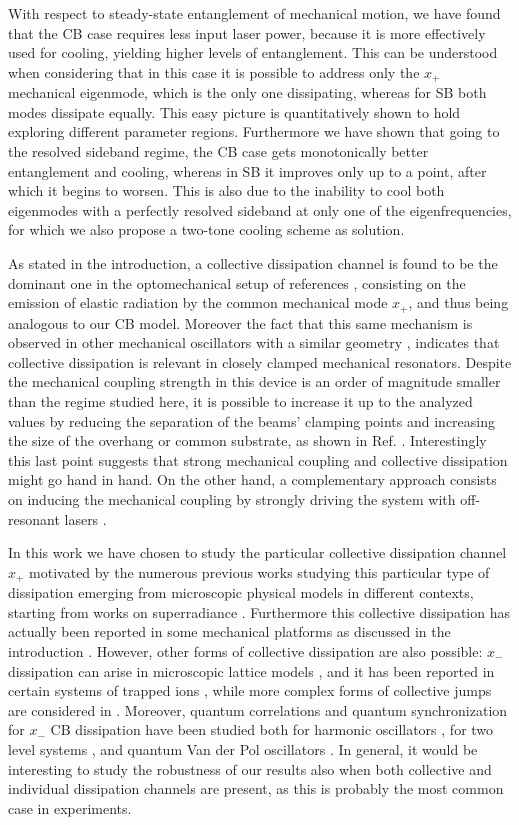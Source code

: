 \documentclass[a4paper]{jpconf}
\begin{document}
With respect to steady-state entanglement of
mechanical motion, we have found that the CB case requires less input laser power, because it
is more effectively used for cooling, yielding higher levels of entanglement. This can be understood
when considering that in this case it is possible to address only the $x_+$ mechanical eigenmode, which is the only one 
dissipating, whereas for SB both modes dissipate equally. This easy picture is quantitatively
shown to hold exploring different parameter regions. Furthermore we have shown that going to the resolved sideband regime, the CB case
gets monotonically better entanglement and cooling, whereas in SB it improves only up to a point, after
which it begins to worsen. This is also due to the inability to cool both eigenmodes with a perfectly
resolved sideband at only one of the eigenfrequencies, for which we also propose a two-tone cooling
scheme as solution.

As stated in the introduction, a collective dissipation channel is found to be the dominant one
in the optomechanical setup of references \cite{32,33}, consisting on the emission of elastic radiation by the common mechanical mode $x_+$, 
and thus being analogous to our CB model. Moreover the fact that this same mechanism is observed in other mechanical oscillators with a 
similar geometry \cite{36,37},
indicates that collective dissipation is relevant in closely clamped mechanical resonators. Despite the mechanical coupling strength
in this device \cite{32,33} is an order of magnitude smaller than the regime studied here, it is possible to
increase it up to the analyzed values by reducing the separation of the beams' clamping points and increasing the size of the overhang or common substrate, as shown in Ref. \cite{57}. 
Interestingly this last point suggests that strong mechanical coupling and collective dissipation might go hand in hand. On the other hand,
a complementary approach consists on inducing the mechanical coupling by strongly driving the system with off-resonant lasers \cite{38}. 

 In this work we have chosen to study the particular collective dissipation channel $x_+$ motivated by the numerous previous works studying this particular type of dissipation
emerging from microscopic physical models in
different contexts, starting from works on superradiance \cite{29}. Furthermore this collective dissipation has actually been reported in some mechanical platforms 
as discussed in the introduction
\cite{32,33,36,37}. However, other forms of collective dissipation are 
also possible: $x_-$ dissipation can arise in microscopic lattice models \cite{31}, and it has been reported in certain systems 
of trapped ions  \cite{ions}, while more complex forms of collective jumps are considered in \cite{zoller}. 
Moreover, quantum correlations and quantum synchronization for $x_-$ CB dissipation have been studied both for harmonic oscillators \cite{30,45}, for two level systems \cite{CB_ent},
and quantum Van der Pol oscillators \cite{extrasync2,extrasync4}. In general,
it would be interesting to study the robustness of our results also when both collective and individual dissipation channels are present, 
as this is probably 
the most common case in experiments.
\end{document}
